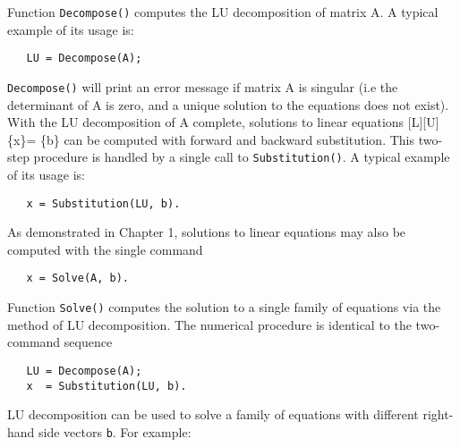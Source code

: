 \vspace{0.15 in}
\noindent\hspace{0.50 in}
Function {\tt Decompose()} computes the LU decomposition of matrix A.
A typical example of its usage is:

\begin{footnotesize}
\begin{verbatim}
   LU = Decompose(A);
\end{verbatim}
\end{footnotesize}

\vspace{0.15 in}\noindent
{\tt Decompose()} will print an error message if matrix A is
singular (i.e the determinant of A is zero, and a unique 
solution to the equations does not exist).
With the LU decomposition of A complete,
solutions to linear equations [L][U]\{x\}= \{b\}
can be computed with forward and backward substitution.
This two-step procedure is handled by a single call
to {\tt Substitution()}. A typical example of its usage is:

\begin{footnotesize}
\begin{verbatim}
   x = Substitution(LU, b).
\end{verbatim}
\end{footnotesize}

\vspace{0.15 in}\noindent
As demonstrated in Chapter 1, solutions to linear equations
may also be computed with the single command

\begin{footnotesize}
\begin{verbatim}
   x = Solve(A, b).
\end{verbatim}
\end{footnotesize}

\vspace{0.15 in}\noindent
Function {\tt Solve()} computes the solution to a single
family of equations via the method of LU decomposition.
The numerical procedure is identical to the two-command sequence

\begin{footnotesize}
\begin{verbatim}
   LU = Decompose(A);
   x  = Substitution(LU, b).
\end{verbatim}
\end{footnotesize}

\vspace{0.15 in}\noindent
LU decomposition can be used to solve a family of equations
with different right-hand side vectors {\tt b}. For example:


